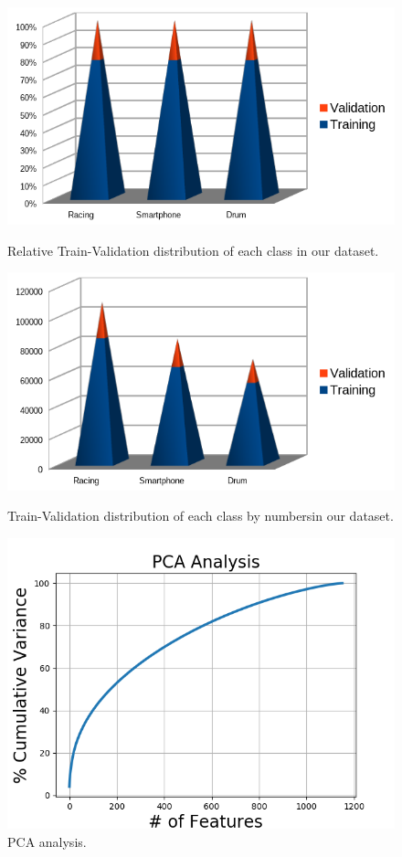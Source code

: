 \documentclass{article}
\begin{document}
\begin{figure}[!htb]
   \begin{minipage}{0.35\textwidth}
     \centering
     \includegraphics[width=\linewidth]{img/d_s}
     \caption{Relative Train-Validation distribution of each class in our dataset.}\label{Fig:Data1}
   \end{minipage}\hfill
   \begin{minipage}{0.35\textwidth}
     \centering
     \includegraphics[width=\linewidth]{img/d}
     \caption{Train-Validation distribution of each class by numbersin our dataset.}\label{Fig:Data2}
   \end{minipage}\hfill
   \begin{minipage}{0.29\textwidth}
     \centering
     \includegraphics[width=\linewidth]{img/PCA_Analysis}
     \caption{PCA analysis.}\label{fig:pca}
   \end{minipage}
\end{figure}
\end{document}
